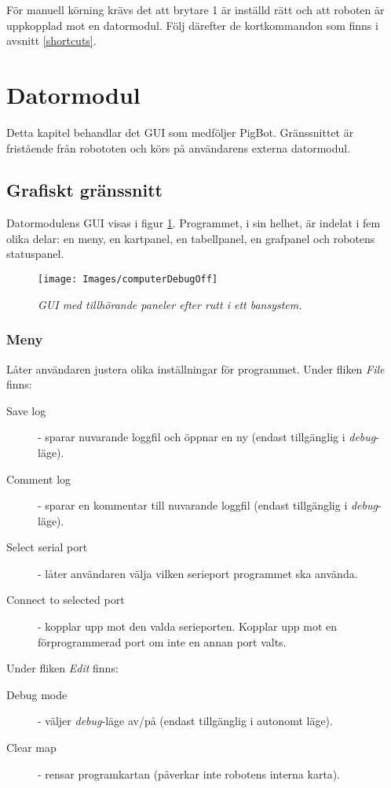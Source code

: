 \documentclass[11pt]{article}
\begin{document}
För manuell körning krävs det att brytare 1 är inställd rätt och att roboten är uppkopplad mot en datormodul. Följ därefter de kortkommandon som finns i avsnitt \ref{shortcuts}.


\section{Datormodul}
Detta kapitel behandlar det GUI som medföljer PigBot. Gränssnittet är fristående från robototen och körs på användarens externa datormodul.

\subsection{Grafiskt gränssnitt}
Datormodulens GUI visas i figur \ref{DebugOff}. Programmet, i sin helhet, är indelat i fem olika delar: en meny, en kartpanel, en tabellpanel, en grafpanel och robotens statuspanel.

\begin{figure}[htbp]
	\centering
	\texttt{[image: Images/computerDebugOff]}
	\caption{\textit{GUI med tillhörande paneler efter rutt i ett bansystem.} \label{DebugOff}}
\end{figure}

\subsubsection{Meny} Låter användaren justera olika inställningar för programmet. Under fliken \emph{File}  finns:
\begin{description}
  \item[Save log] - sparar nuvarande loggfil och öppnar en ny (endast tillgänglig i \textit{debug}-läge).
  \item[Comment log] - sparar en kommentar till nuvarande loggfil (endast tillgänglig i \textit{debug}-läge).
	\item[Select serial port] - låter användaren välja vilken serieport programmet ska använda.
	\item[Connect to selected port] - kopplar upp mot den valda serieporten. Kopplar upp mot en förprogrammerad port om inte en annan port valts. 
\end{description}

Under fliken \emph{Edit} finns:
\begin{description}
  \item[Debug mode] - väljer \textit{debug}-läge av/på (endast tillgänglig i autonomt läge).
	\item [Clear map] - rensar programkartan (påverkar inte robotens interna karta).
\end{description}
\end{document}
